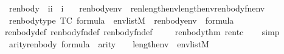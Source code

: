 \begin{isabellebody}
\isanewline
{}\isamarkupfalse%
\isanewline
\ \ renbody\ {\isacharcolon}{\kern0pt}{\isacharcolon}{\kern0pt}\ {\isachardoublequoteopen}{\isacharbrackleft}{\kern0pt}i{\isacharcomma}{\kern0pt}i{\isacharbrackright}{\kern0pt}\ {\isasymRightarrow}\ i{\isachardoublequoteclose}\ \isanewline
\ \ {\isachardoublequoteopen}renbody{\isacharparenleft}{\kern0pt}{\isasymphi}{\isacharcomma}{\kern0pt}env{\isacharparenright}{\kern0pt}\ {\isacharequal}{\kern0pt}\ ren{\isacharparenleft}{\kern0pt}{\isasymphi}{\isacharparenright}{\kern0pt}{\isacharbackquote}{\kern0pt}{\isacharparenleft}{\kern0pt}{}{\isacharhash}{\kern0pt}{\isacharplus}{\kern0pt}length{\isacharparenleft}{\kern0pt}env{\isacharparenright}{\kern0pt}{\isacharparenright}{\kern0pt}{\isacharbackquote}{\kern0pt}{\isacharparenleft}{\kern0pt}{}{\isacharhash}{\kern0pt}{\isacharplus}{\kern0pt}length{\isacharparenleft}{\kern0pt}env{\isacharparenright}{\kern0pt}{\isacharparenright}{\kern0pt}{\isacharbackquote}{\kern0pt}renbody{\isacharunderscore}{\kern0pt}fn{\isacharparenleft}{\kern0pt}env{\isacharparenright}{\kern0pt}{\isachardoublequoteclose}\isanewline
\isanewline
{}\isamarkupfalse%
\isanewline
\ \ renbody{\isacharunderscore}{\kern0pt}type\ {\isacharbrackleft}{\kern0pt}TC{\isacharbrackright}{\kern0pt}{\isacharcolon}{\kern0pt}\ {\isachardoublequoteopen}{\isasymphi}{\isasymin}formula\ {\isasymLongrightarrow}\ env{\isasymin}list{\isacharparenleft}{\kern0pt}M{\isacharparenright}{\kern0pt}\ {\isasymLongrightarrow}\ renbody{\isacharparenleft}{\kern0pt}{\isasymphi}{\isacharcomma}{\kern0pt}env{\isacharparenright}{\kern0pt}\ {\isasymin}\ formula{\isachardoublequoteclose}\isanewline
%
\isadelimproof
\ \ %
\endisadelimproof
%
\isatagproof
{}\isamarkupfalse%
\ renbody{\isacharunderscore}{\kern0pt}def\ renbody{\isacharunderscore}{\kern0pt}fn{\isacharunderscore}{\kern0pt}def\ renbody{}{\isacharunderscore}{\kern0pt}fn{\isacharunderscore}{\kern0pt}def\isanewline
\ \ \isamarkupfalse%
\ \ renbody{}{\isacharunderscore}{\kern0pt}thm{\isacharparenleft}{\kern0pt}{}{\isacharparenright}{\kern0pt}\ ren{\isacharunderscore}{\kern0pt}tc\isanewline
\ \ \isamarkupfalse%
\ simp%
\endisatagproof
{\isafoldproof}%
%
\isadelimproof
\isanewline
%
\endisadelimproof
\isanewline
{}\isamarkupfalse%
\ \ arity{\isacharunderscore}{\kern0pt}renbody{\isacharcolon}{\kern0pt}\ {\isachardoublequoteopen}{\isasymphi}{\isasymin}formula\ {\isasymLongrightarrow}\ arity{\isacharparenleft}{\kern0pt}{\isasymphi}{\isacharparenright}{\kern0pt}\ {\isasymle}\ {}\ {\isacharhash}{\kern0pt}{\isacharplus}{\kern0pt}\ length{\isacharparenleft}{\kern0pt}env{\isacharparenright}{\kern0pt}\ {\isasymLongrightarrow}\ env{\isasymin}list{\isacharparenleft}{\kern0pt}M{\isacharparenright}{\kern0pt}\ {\isasymLongrightarrow}\isanewline

\end{isabellebody}
